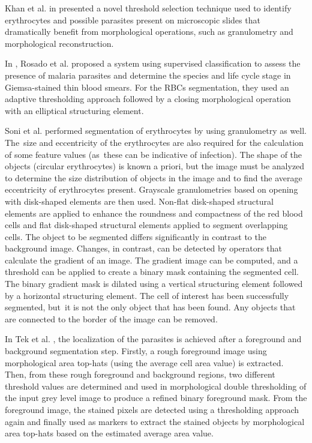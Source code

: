 Khan et al. in \cite{Khan2011} presented a novel threshold selection technique used to identify erythrocytes and possible parasites present on microscopic slides that dramatically benefit from morphological operations, such as granulometry and morphological reconstruction.

In \cite{Rosado2017}, Rosado et al. proposed a system using supervised classification to assess the presence of malaria parasites and determine the species and life cycle stage in Giemsa-stained thin blood smears. For the RBCs segmentation, they used an adaptive thresholding approach followed by a closing morphological operation with an elliptical structuring element.

Soni et al. \cite{Soni2011} performed segmentation of erythrocytes by using granulometry as well. The~size and eccentricity of the erythrocytes are also required for the calculation of some feature values (as~these can be indicative of infection). The shape of the objects (circular erythrocytes) is known a priori, but the image must be analyzed to determine the size distribution of objects in the image and to find the average eccentricity of erythrocytes present.
Grayscale granulometries based on opening with disk-shaped elements are then used. Non-flat disk-shaped structural elements are applied to enhance the roundness and compactness of the red blood cells and flat disk-shaped structural elements applied to segment overlapping cells. The object to be segmented differs significantly in contrast to the background image. Changes, in contrast, can be detected by operators that calculate the gradient of an image. The gradient image can be computed, and a threshold can be applied to create a binary mask containing the segmented cell. The binary gradient mask is dilated using a vertical structuring element followed by a horizontal structuring element. The cell of interest has been successfully segmented, but~it is not the only object that has been found. Any objects that are connected to the border of the image can be removed.

In Tek et al. \cite{Tek2010}, the localization of the parasites is achieved after a foreground and background segmentation step. Firstly, a rough foreground image using morphological area top-hats (using the average cell area value) is extracted. Then, from these rough foreground and background regions, two different threshold values are determined and used in morphological double thresholding of the input grey level image to produce a refined binary foreground mask. From the foreground image, the stained pixels are detected using a thresholding approach again and finally used as markers to extract the stained objects by morphological area top-hats based on the estimated average area value.


